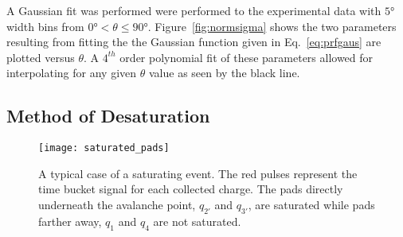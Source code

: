 \begin{comment}
\begin{table}
\centering
 \begin{tabular}{||c c c c c c||} 
 \hline
 Coefficient & $c_0$ & $c_1$ & $c_2$ & $c_3$ & $c_4$ \\ [0.5ex] 
 \hline\hline
 $0 < \theta < 45$ & & & & &  \\ [.25ex]
 \hline
 $N_0$ & .897 & 5.766E-3 & -4.263E-4 & 7.444E-6 & 5.705E-8 \\ 
 \hline
 $\sigma$ & 5.496 & -3.920E-2 & 2.693E-3 & -5.208E-5 & 5.334E-7\\
 \hline
 $45 < \theta < 90$ & & & &  & \\ [.25ex]
 \hline	
 $N_0$ & 1.220 & -6.258E-2 & 1.608E-3 & -1.492E-5  & 4.654E-8 \\
 \hline
 $\sigma$ & 31.368 & -1.109 & 1.779E-2 & -1.336E-4 & 3.940E-7\\
 \hline
\end{tabular}
\caption{Coefficients of the $4_th$ order polynomial fit to the Gaussian parameters $N_0$ and $\sigma$. The polynomial form is given as $c_0 + c_1 x + c_2 x^2 + c_3 x^3 + c_4 x^4$}
\label{tb:coeff}
\end{table}
\end{comment}
 
A Gaussian fit was performed were performed to the experimental data with  $\ang{5}$ width bins from $\ang{0} < \theta \leq \ang{90}$. Figure~\ref{fig:normsigma} shows the two parameters resulting from fitting the the Gaussian function given in Eq.~\ref{eq:prfgaus} are plotted versus $\theta$. A $4^{th}$ order polynomial fit of these parameters allowed for interpolating for any given $\theta$ value as seen by the black line. 


\subsection{Method of Desaturation}
\label{sec:desat}

\begin{figure}[ht!]
\texttt{[image: saturated\_pads]}
\caption{A typical case of a saturating event. The red pulses represent the time bucket signal for each collected charge. The pads directly underneath the avalanche point, $q_{2'}$ and $q_{3'}$, are saturated while pads farther away, $q_1$ and $q_4$ are not saturated.}
\label{fig:satpad}
\end{figure}


